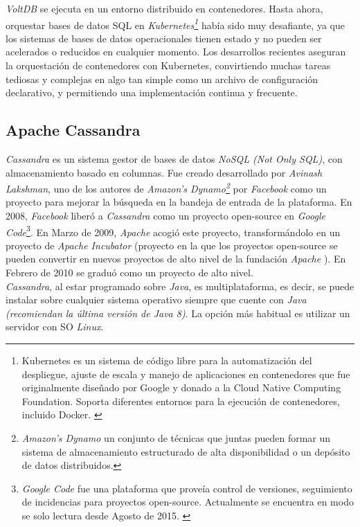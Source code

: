\documentclass[3pt]{article}
\begin{document}
\emph{VoltDB} se ejecuta en un entorno distribuido en contenedores. Hasta ahora, orquestar bases de datos SQL en \emph{Kubernetes\footnote{Kubernetes es un sistema de código libre para la automatización del despliegue, ajuste de escala y manejo de aplicaciones en contenedores que fue originalmente diseñado por Google y donado a la Cloud Native Computing Foundation. Soporta diferentes entornos para la ejecución de contenedores, incluido Docker. \cite{VOLT:7}}} había sido muy desafiante, ya que los sistemas de bases de datos operacionales tienen estado y no pueden ser acelerados o reducidos en cualquier momento. Los desarrollos recientes aseguran la orquestación de contenedores con Kubernetes, convirtiendo muchas tareas tediosas y complejas en algo tan simple como un archivo de configuración declarativo, y permitiendo una implementación continua y frecuente. \cite{VOLT:6}\\

\subsection{Apache Cassandra}

\emph{Cassandra} es un sistema gestor de bases de datos \emph{NoSQL (Not Only SQL)}, con almacenamiento basado en columnas. Fue creado desarrollado por \emph{Avinash Lakshman}, uno de los autores de \emph{Amazon's Dynamo\footnote{\emph{Amazon's Dynamo} un conjunto de técnicas que juntas pueden formar un sistema de almacenamiento estructurado de alta disponibilidad o un depósito de datos distribuidos.\cite{WIKI:3}}} por \emph{Facebook} como un proyecto para mejorar la búsqueda en la bandeja de entrada de la plataforma. En 2008, \emph{Facebook} liberó a \emph{Cassandra} como un proyecto open-source en \emph{Google Code}\footnote{\emph{Google Code} fue una plataforma que proveía control de versiones, seguimiento de incidencias para proyectos open-source. Actualmente se encuentra en modo se solo lectura desde Agosto de 2015. \cite{WIKI:4}}. En Marzo de 2009, \emph{Apache} acogió este proyecto, transformándolo en un proyecto de \emph{Apache Incubator} (proyecto en la que los proyectos open-source se pueden convertir en nuevos proyectos de alto nivel de la fundación \emph{Apache} \cite{AP:1}). En Febrero de 2010 se graduó como un proyecto de alto nivel. \cite{WIKI:5}\\

\emph{Cassandra}, al estar programado sobre \emph{Java}, es multiplataforma, es decir, se puede instalar sobre cualquier sistema operativo siempre que cuente con \emph{Java (recomiendan la última versión de Java 8)}. La opción más habitual es utilizar un servidor con SO \emph{Linux}. \cite{AP:2}\\
\end{document}
